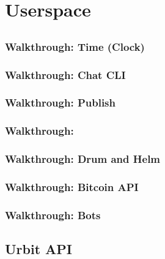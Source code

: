\setchapterpreamble[u]{\margintoc}
\chapter{Userspace}


\section{\gall}

\subsection{Walkthrough:  Time (Clock)}

\subsection{Walkthrough:  Chat CLI}

\subsection{Walkthrough:  Publish}

\subsection{Walkthrough:  \graphstore}

\subsection{Walkthrough:  Drum and Helm}

\subsection{Walkthrough:  Bitcoin API}

\subsection{Walkthrough:  Bots}

\section{Urbit API}
